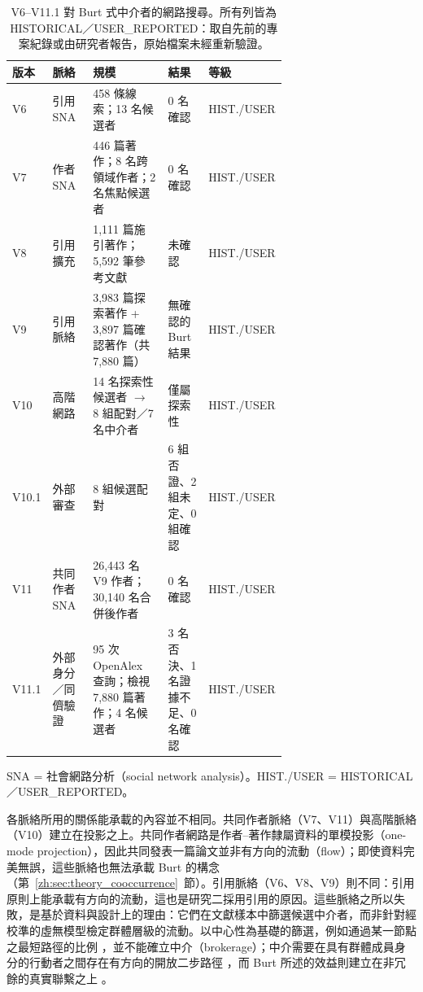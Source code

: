 \begin{table}[tbp]
  \centering
  \small
  \caption{V6--V11.1 對 Burt 式中介者的網路搜尋。所有列皆為 HISTORICAL／USER\_REPORTED：取自先前的專案紀錄或由研究者報告，原始檔案未經重新驗證。}
  \label{zh:tab:network_lines}
  \setlength{\tabcolsep}{4pt}
  \begin{tabular}{l p{0.17\linewidth} p{0.33\linewidth} p{0.17\linewidth} l}
    \toprule
    版本 & 脈絡 & 規模 & 結果 & 等級 \\
    \midrule
    V6 & 引用 SNA & 458 條線索；13 名候選者 & 0 名確認 & HIST./USER \\
    V7 & 作者 SNA & 446 篇著作；8 名跨領域作者；2 名焦點候選者 & 0 名確認 & HIST./USER \\
    V8 & 引用擴充 & 1,111 篇施引著作；5,592 筆參考文獻 & 未確認 & HIST./USER \\
    V9 & 引用脈絡 & 3,983 篇探索著作 + 3,897 篇確認著作（共 7,880 篇） & 無確認的 Burt 結果 & HIST./USER \\
    V10 & 高階網路 & 14 名探索性候選者 $\rightarrow$ 8 組配對／7 名中介者 & 僅屬探索性 & HIST./USER \\
    V10.1 & 外部審查 & 8 組候選配對 & 6 組否證、2 組未定、0 組確認 & HIST./USER \\
    V11 & 共同作者 SNA & 26,443 名 V9 作者；30,140 名合併後作者 & 0 名確認 & HIST./USER \\
    V11.1 & 外部身分／同儕驗證 & 95 次 OpenAlex 查詢；檢視 7,880 篇著作；4 名候選者 & 3 名否決、1 名證據不足、0 名確認 & HIST./USER \\
    \bottomrule
  \end{tabular}

  \smallskip
  \raggedright\footnotesize SNA = 社會網路分析（social network analysis）。HIST./USER = HISTORICAL／USER\_REPORTED。
\end{table}

各脈絡所用的關係能承載的內容並不相同。共同作者脈絡（V7、V11）與高階脈絡（V10）建立在投影之上。共同作者網路是作者--著作隸屬資料的單模投影（one-mode projection）\citep{newman2001scientific}，因此共同發表一篇論文並非有方向的流動（flow）；即使資料完美無誤，這些脈絡也無法承載 Burt 的構念（第~\ref{zh:sec:theory_cooccurrence}~節）。引用脈絡（V6、V8、V9）則不同：引用原則上能承載有方向的流動，這也是研究二採用引用的原因。這些脈絡之所以失敗，是基於資料與設計上的理由：它們在文獻樣本中篩選候選中介者，而非針對經校準的虛無模型檢定群體層級的流動。以中心性為基礎的篩選，例如通過某一節點之最短路徑的比例 \citep{freeman1977set}，並不能確立中介（brokerage）；中介需要在具有群體成員身分的行動者之間存在有方向的開放二步路徑 \citep{gould1989structures}，而 Burt 所述的效益則建立在非冗餘的真實聯繫之上 \citep{burt1992structural}。


